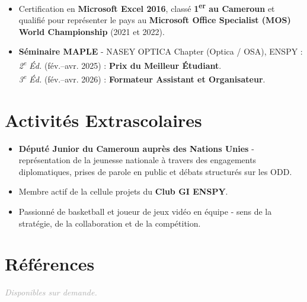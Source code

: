 \documentclass[10pt, a4paper]{article}
\begin{document}
\begin{itemize}
  \item Certification en \textbf{Microsoft Excel 2016}, classé \textbf{1\textsuperscript{er}
        au Cameroun} et qualifié pour représenter le pays au \textbf{Microsoft Office Specialist
        (MOS) World Championship} (2021 et 2022).
  \item \textbf{Séminaire MAPLE} - NASEY OPTICA Chapter (Optica / OSA), ENSPY :\\
        \textit{2\textsuperscript{e} Éd.} (fév.--avr. 2025) : \textbf{Prix du Meilleur Étudiant}.\\
        \textit{3\textsuperscript{e} Éd.} (fév.--avr. 2026) : \textbf{Formateur Assistant et
        Organisateur}.
\end{itemize}

\section{Activités Extrascolaires}

\begin{itemize}
  \item \textbf{Député Junior du Cameroun auprès des Nations Unies} - représentation de la
        jeunesse nationale à travers des engagements diplomatiques, prises de parole en public
        et débats structurés sur les ODD.
  \item Membre actif de la cellule projets du \textbf{Club GI ENSPY}.
  \item Passionné de basketball et joueur de jeux vidéo en équipe - sens de la stratégie,
        de la collaboration et de la compétition.
\end{itemize}

\section{Références}

\textit{\textcolor{darkgray}{Disponibles sur demande.}}
\end{document}

